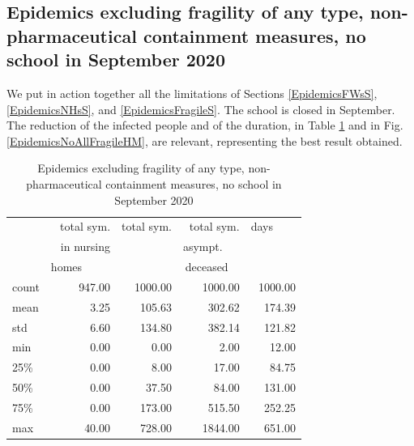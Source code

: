 \documentclass[11pt]{article}
\begin{document}
\subsection{Epidemics excluding fragility of any type, non-pharmaceutical containment measures, no school in September 2020}
\label{EpidemicsNoAllFragileS}

We put in action together all the limitations of Sections \ref{EpidemicsFWsS}, \ref{EpidemicsNHsS}, and \ref{EpidemicsFragileS}. The school is closed in September. The reduction of the infected people and of the duration, in Table \ref{EpidemicsNoAllFragileT} and in Fig. \ref{EpidemicsNoAllFragileHM}, are relevant, representing the best result obtained.


\begin{table}[H]
\center
\small
\begin{tabular}{lrrrr}
\toprule
{} & total sym.        &  total sym. & total sym.     & days~~~~ \\
{} & in nursing        &                  & asympt.~~~  & \\
{} & homes~~~~~  &                  & deceased~~ & \\
\midrule
count &     947.00 &             1000.00 &                 1000.00 & 1000.00 \\
mean  &       3.25 &              105.63 &                  302.62 &  174.39 \\
std   &       6.60 &              134.80 &                  382.14 &  121.82 \\
min   &       0.00 &                0.00 &                    2.00 &   12.00 \\
25\%   &       0.00 &                8.00 &                   17.00 &   84.75 \\
50\%   &       0.00 &               37.50 &                   84.00 &  131.00 \\
75\%   &       0.00 &              173.00 &                  515.50 &  252.25 \\
max   &      40.00 &              728.00 &                 1844.00 &  651.00 \\
\bottomrule
\end{tabular}

\label{EpidemicsNoAllFragileT}
\caption{Epidemics excluding fragility of any type, non-pharmaceutical containment measures, no school in September 2020}
\end{table}
\end{document}
